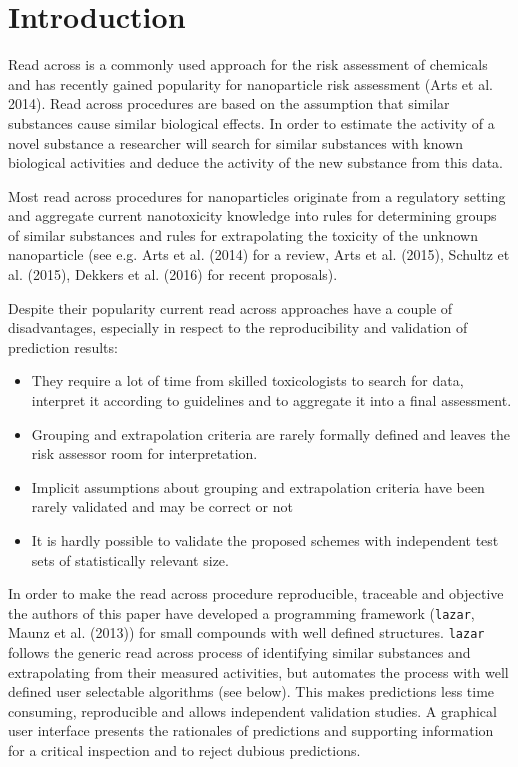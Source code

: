 \documentclass[utf8]{frontiersHLTH} %
\providecommand{\tightlist}{%
  \setlength{\itemsep}{0pt}\setlength{\parskip}{0pt}}
\begin{document}
\section{Introduction}\label{introduction}

Read across is a commonly used approach for the risk assessment of
chemicals and has recently gained popularity for nanoparticle risk
assessment (Arts et al. 2014). Read across procedures are based on the
assumption that similar substances cause similar biological effects. In
order to estimate the activity of a novel substance a researcher will
search for similar substances with known biological activities and
deduce the activity of the new substance from this data.

Most read across procedures for nanoparticles originate from a
regulatory setting and aggregate current nanotoxicity knowledge into
rules for determining groups of similar substances and rules for
extrapolating the toxicity of the unknown nanoparticle (see e.g. Arts et
al. (2014) for a review, Arts et al. (2015), Schultz et al. (2015),
Dekkers et al. (2016) for recent proposals).

Despite their popularity current read across approaches have a couple of
disadvantages, especially in respect to the reproducibility and
validation of prediction results:

\begin{itemize}
\tightlist
\item
  They require a lot of time from skilled toxicologists to search for
  data, interpret it according to guidelines and to aggregate it into a
  final assessment.
\item
  Grouping and extrapolation criteria are rarely formally defined and
  leaves the risk assessor room for interpretation.
\item
  Implicit assumptions about grouping and extrapolation criteria have
  been rarely validated and may be correct or not
\item
  It is hardly possible to validate the proposed schemes with
  independent test sets of statistically relevant size.
\end{itemize}

In order to make the read across procedure reproducible, traceable and
objective the authors of this paper have developed a programming
framework (\texttt{lazar}, Maunz et al. (2013)) for small compounds with
well defined structures. \texttt{lazar} follows the generic read across
process of identifying similar substances and extrapolating from their
measured activities, but automates the process with well defined user
selectable algorithms (see below). This makes predictions less time
consuming, reproducible and allows independent validation studies. A
graphical user interface presents the rationales of predictions and
supporting information for a critical inspection and to reject dubious
predictions.
\end{document}
